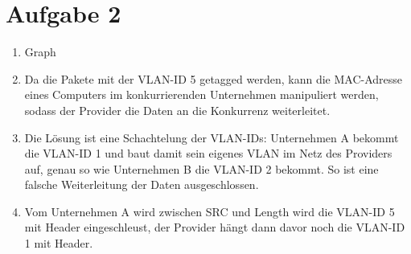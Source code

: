 \documentclass{article}
\begin{document}
	\section*{Aufgabe 2}
	\begin{enumerate}[label=(\alph*)]
		\item Graph
		\begin{center}
		\end{center}
		\item Da die Pakete mit der VLAN-ID 5 getagged werden, kann die MAC-Adresse eines Computers im konkurrierenden Unternehmen manipuliert werden, sodass der Provider die Daten an die Konkurrenz weiterleitet.
		\item Die Lösung ist eine Schachtelung der VLAN-IDs: Unternehmen A bekommt die VLAN-ID 1 und baut damit sein eigenes VLAN im Netz des Providers auf, genau so wie Unternehmen B die VLAN-ID 2 bekommt. So ist eine falsche Weiterleitung der Daten ausgeschlossen.
		\item Vom Unternehmen A wird zwischen SRC und Length wird die VLAN-ID 5 mit Header eingeschleust, der Provider hängt dann davor noch die VLAN-ID 1 mit Header.
	\end{enumerate}
\end{document}
